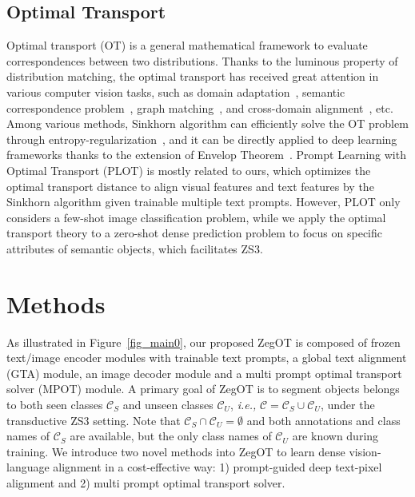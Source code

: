 \documentclass[nohyperref]{article}
\newcommand{\mc}{\mathcal}
\theoremstyle{plain}
\theoremstyle{definition}
\theoremstyle{remark}
\begin{document}
\subsection{Optimal Transport}
Optimal transport (OT) is a general mathematical framework to evaluate correspondences between two distributions. 
Thanks to the luminous property of distribution matching, the optimal transport  has received great attention in various computer vision tasks, such as domain adaptation~\cite{flamary2016optimal}, semantic correspondence problem~\cite{liu2020semantic}, graph matching~\cite{xu2019scalable,xu2019gromov}, and cross-domain alignment~\cite{chen2020graph}, etc.  
Among various methods, Sinkhorn algorithm can efficiently solve the OT problem through entropy-regularization~\cite{cuturi2013sinkhorn}, and it can be directly applied to deep learning frameworks thanks to the extension of Envelop Theorem~\cite{peyre2019computational}. 
Prompt Learning with Optimal Transport (PLOT) \cite{chen2022prompt} is mostly related to ours, which optimizes the optimal transport distance to align visual features and text features by the Sinkhorn algorithm given trainable multiple text prompts. However, PLOT only considers a few-shot image classification problem, while we apply the optimal transport theory to a zero-shot dense prediction problem to focus on
specific attributes of semantic objects, which facilitates ZS3.  %

\section{Methods}
\label{methods}
As illustrated in Figure~\ref{fig_main0}, our proposed ZegOT is composed of frozen text/image encoder modules with trainable text prompts, a global text alignment (GTA) module, an image decoder module and a multi prompt optimal transport solver (MPOT) module. A primary goal of ZegOT is to segment objects belongs to both seen classes $\mc{C}_S$ and unseen classes $\mc{C}_U$, \textit{i.e.,} $\mc{C} = \mc{C}_{S} \cup \mc{C}_U$, under the transductive ZS3 setting. %
Note that $\mc{C}_S \cap \mc{C}_U = \emptyset$ and 
both annotations and class names of $\mc{C}_S$ are available, but the only class names of
$\mc{C}_U$ are known during training. 
We introduce two novel methods into ZegOT to learn dense vision-language alignment in a cost-effective way: 1) prompt-guided deep text-pixel alignment and 2) multi prompt optimal transport solver.
\end{document}

